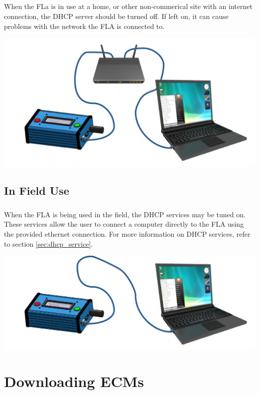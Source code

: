 \documentclass[11pt, oneside]{book}
\begin{document}
\paragraph{  }
When the FLa is in use at a home, or other non-commerical site with an internet connection, the DHCP server should be turned off. If left on, it can cause problems with the network the FLA is connected to.
\begin{center}
\includegraphics[width=.9\linewidth]{../media/graphics/fla_at_home}
\end{center}
\section{In Field Use}\label{setting_fla_in_field}
\paragraph{  }
When the FLA is being used in the field, the DHCP services may be tuned on. These services allow the user to connect a computer directly to the FLA using the provided ethernet connection. For more information on DHCP services, refer to section \ref{sec:dhcp_service}.
\begin{center}
\includegraphics[width=.9\linewidth]{../media/graphics/fla_in_field}
\end{center}
\chapter{Downloading ECMs}
\end{document}

